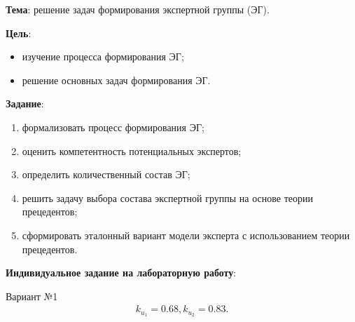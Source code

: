 



\newcommand{\labnumber}{1} %



\usepackage{systeme}
\usepackage{longtable,tabu}
\usepackage{multirow}
\usepackage{array,multirow}
\usepackage{pdflscape}
\usepackage{afterpage}
\usepackage{bm}

\graphicspath{{../figures/}}


\Russian


\addtocounter{page}{1}

\textbf{Тема}: решение задач формирования экспертной группы (ЭГ).

\textbf{Цель}: 
\begin{itemize}
	\item изучение процесса формирования ЭГ;
	\item решение основных задач формирования ЭГ.
\end{itemize}

\textbf{Задание}:
\begin{enumerate}[label={\arabic*)}]
	\item формализовать процесс формирования ЭГ;
	\item оценить компетентность потенциальных экспертов;
	\item определить количественный состав ЭГ;
	\item решить задачу выбора состава экспертной группы на основе теории прецедентов;
	\item сформировать эталонный вариант модели эксперта с использованием теории прецедентов.
\end{enumerate}

\textbf{Индивидуальное задание на лабораторную работу}:

Вариант №1
\begin{align*}
	k_{u_1}=0.68, k_{u_2}=0.83.
\end{align*}

